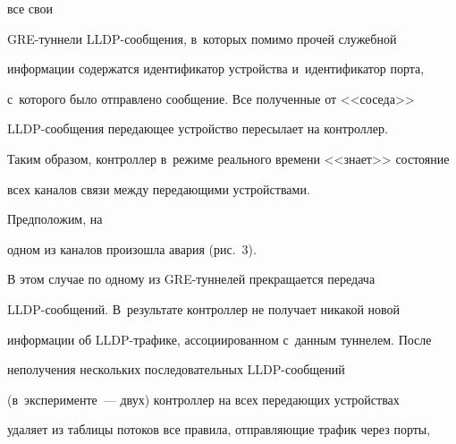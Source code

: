 




\noindent


 все свои  


GRE-тун\-не\-ли LLDP-со\-об\-ще\-ния, в~которых помимо прочей служебной 


информации содержатся идентификатор устройства и~идентификатор порта, 


с~которого было отправлено сообщение. Все полученные от <<соседа>>  


LLDP-со\-об\-ще\-ния передающее устройство пересылает на контроллер. 


Таким образом, контроллер в~режиме реального времени <<знает>> состояние 


всех каналов связи между передающими устройствами. 





Предположим, на 


одном из каналов произошла авария (рис.~3).


    В этом случае по одному из GRE-туннелей прекращается передача  


LLDP-со\-об\-ще\-ний. В~результате контроллер не получает никакой новой 


информации об \mbox{LLDP-тра}\-фи\-ке, ассоциированном с~данным туннелем. После 


неполучения нескольких последовательных LLDP-со\-об\-ще\-ний 


(в~эксперименте~--- двух) контроллер на всех передающих устройствах 


удаляет из таблицы потоков все правила, отправляющие трафик через порты, 



